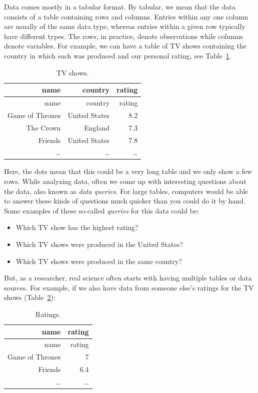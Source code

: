 \documentclass[
  notoc %
]{tufte-book}
\providecommand{\tightlist}{%
  \setlength{\itemsep}{0pt}\setlength{\parskip}{0pt}
}
\begin{document}
Data comes mostly in a tabular format. By tabular, we mean that the data
consists of a table containing rows and columns. Entries within any one
column are usually of the same data type, whereas entries within a given
row typically have different types. The rows, in practice, denote
observations while columns denote variables. For example, we can have a
table of TV shows containing the country in which each was produced and
our personal rating, see Table~\ref{tbl:TV_shows}.

\hypertarget{tbl:TV_shows}{}
\begin{longtable}[]{@{}rrr@{}}
\caption{\label{tbl:TV_shows}TV shows.}\tabularnewline
\toprule
name & country & rating \\
\midrule
\endfirsthead
\toprule
name & country & rating \\
\midrule
\endhead
Game of Thrones & United States & 8.2 \\
The Crown & England & 7.3 \\
Friends & United States & 7.8 \\
\ldots{} & \ldots{} & \ldots{} \\
\bottomrule
\end{longtable}

Here, the dots mean that this could be a very long table and we only
show a few rows. While analyzing data, often we come up with interesting
questions about the data, also known as \emph{data queries}. For large
tables, computers would be able to answer these kinds of questions much
quicker than you could do it by hand. Some examples of these so-called
\emph{queries} for this data could be:

\begin{itemize}
\tightlist
\item
  Which TV show has the highest rating?
\item
  Which TV shows were produced in the United States?
\item
  Which TV shows were produced in the same country?
\end{itemize}

But, as a researcher, real science often starts with having multiple
tables or data sources. For example, if we also have data from someone
else's ratings for the TV shows (Table~\ref{tbl:ratings}):

\hypertarget{tbl:ratings}{}
\begin{longtable}[]{@{}rr@{}}
\caption{\label{tbl:ratings}Ratings.}\tabularnewline
\toprule
name & rating \\
\midrule
\endfirsthead
\toprule
name & rating \\
\midrule
\endhead
Game of Thrones & 7 \\
Friends & 6.4 \\
\ldots{} & \ldots{} \\
\bottomrule
\end{longtable}
\end{document}
